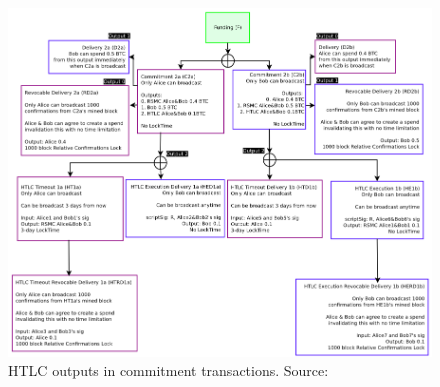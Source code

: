 \begin{figure}[ht]
    \centering
    \includegraphics[width=14cm]{figures/ln_htlc.png}
    \caption{HTLC outputs in commitment transactions.  Source:~\cite{poon2015bitcoin}}
    \label{fig:htlc_commit}
\end{figure}

